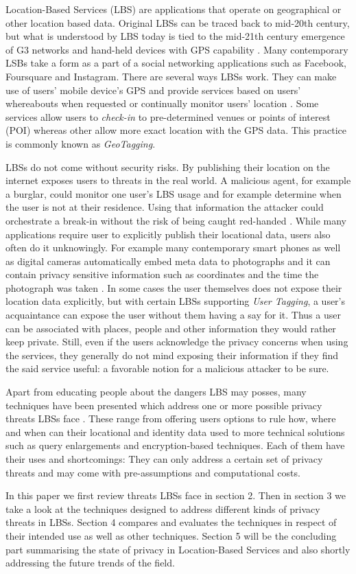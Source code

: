 \documentclass[english]{tktltiki2}
\theoremstyle{definition}
\theoremstyle{remark}
\begin{document}
Location-Based Services (LBS) are applications that operate on geographical or other location based data. Original LBSs can be traced back to mid-20th century, but what is understood by LBS today is tied to the mid-21th century emergence of G3 networks and hand-held devices with GPS capability \cite{History}. Many contemporary LSBs take a form as a part of a social networking applications such as Facebook, Foursquare and Instagram. There are several ways LBSs work. They can make use of users' mobile device's GPS and provide services based on users' whereabouts when requested or continually monitor users' location \cite{LocationPrivacy}. Some services allow users to \textit{check-in} to pre-determined venues or points of interest (POI) whereas other allow more exact location with the GPS data. This practice is commonly known as \textit{GeoTagging}. \par
LBSs do not come without security risks. By publishing their location on the internet exposes users to threats in the real world. A malicious agent, for example a burglar, could monitor one user's LBS usage and for example determine when the user is not at their residence. Using that information the attacker could orchestrate a break-in without the risk of being caught red-handed \cite{Friedland2010}. While many applications require user to explicitly publish their locational data, users also often do it unknowingly. For example many contemporary smart phones as well as digital cameras automatically embed meta data to photographs and it can contain privacy sensitive information such as coordinates and the time the photograph was taken \cite{Friedland2010}. In some cases the user themselves does not expose their location data explicitly, but with certain LBSs supporting \textit{User Tagging}, a user's acquaintance can expose the user without them having a say for it. Thus a user can be associated with places, people and other information they would rather keep private. Still, even if the users acknowledge the privacy concerns when using the services, they generally do not mind exposing their information if they find the said service useful\cite{Barkhuus2003, Krumm2008}: a favorable notion for a malicious attacker to be sure.  \par
Apart from educating people about the dangers LBS may posses, many techniques have been presented which address one or more possible privacy threats LBSs face \cite{LocationPrivacy}. These range from offering users options to rule how, where and when can their locational and identity data used to more technical solutions such as query enlargements and encryption-based techniques. Each of them have their uses and shortcomings: They can only address a certain set of privacy threats and may come with pre-assumptions and computational costs. \par 
In this paper we first review threats LBSs face in section 2. Then in section 3 we take a look at the techniques designed to address different kinds of privacy threats in LBSs. Section 4 compares and evaluates the techniques in respect of their intended use as well as other techniques. Section 5 will be the concluding part summarising the state of privacy in Location-Based Services and also shortly addressing the future trends of the field. 
\end{document}
